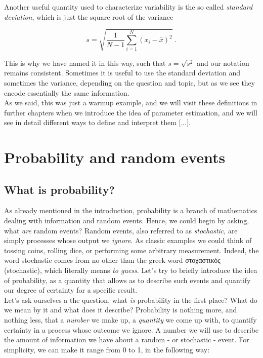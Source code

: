 \documentclass{book}
\begin{document}
Another useful quantity used to characterize variability is the so called \textit{standard deviation}, which is just the square root of the variance

\begin{equation}
s = \sqrt{\frac{1}{N - 1} \sum_{i = 1}^{N} (x_{i} - \bar{x})^{2}} \; . 
\end{equation}

This is why we have named it in this way, such that $s = \sqrt{s^{2}}$ and our notation remains consistent. Sometimes it is useful to use the standard deviation and sometimes the variance, depending on the question and topic, but as we see they encode essentially the same information.\\

As we said, this was just a warmup example, and we will visit these definitions in further chapters when we introduce the idea of parameter estimation, and we will see in detail different ways to define and interpret them [...]. \\



\chapter{Probability and random events}

\section{What is probability?}

As already mentioned in the introduction, probability is a branch of mathematics dealing with information and random events. Hence, we could begin by asking, what \textit{are} random events? Random events, also referred to as \textit{stochastic}, are simply processes whose output we \textit{ignore}. As classic examples we could think of tossing coins, rolling dice, or performing some arbitrary measurement. Indeed, the word stochastic comes from no other than the greek word \textgreek{στοχαστικός} (stochastic), which literally means \textit{to guess}. Let's try to briefly introduce the idea of probability, as a quantity that allows as to describe such events and quantify our degree of certainty for a specific result.\\

Let's ask ourselves a the question, what \textit{is} probability in the first place? What do we mean by it and what does it describe? Probability is nothing more, and nothing less, that a \textit{number} we make up, a \textit{quantity} we come up with, to quantify certainty in a process whose outcome we ignore. A number we will use to describe the amount of information we have about a random - or stochastic - event. For simplicity, we can make it range from 0 to 1, in the following way:
\end{document}
